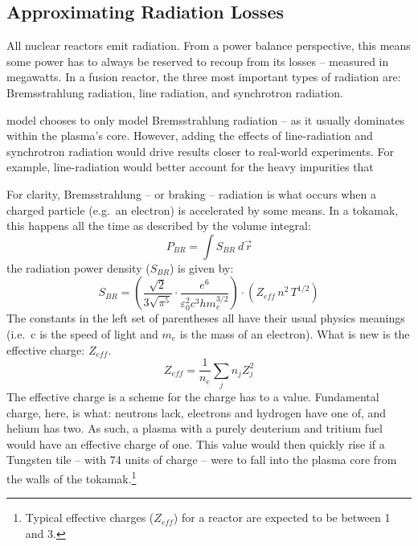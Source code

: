 \subsection{Approximating Radiation Losses}

All nuclear reactors emit radiation. From a power balance perspective, this means some power has to always be reserved to recoup from its losses -- measured in megawatts. In a fusion reactor, the three most important types of radiation are: Bremsstrahlung radiation, line radiation, and synchrotron radiation.

 model chooses to only model Bremsstrahlung radiation -- as it usually dominates within the plasma's core.  However, adding the effects of line-radiation and synchrotron radiation would drive results closer to real-world experiments. For example, line-radiation would better account for the  heavy impurities that 

For clarity, Bremsstrahlung -- or braking -- radiation is what occurs when a charged particle (e.g.\ an electron) is accelerated by some means. In a tokamak, this happens all the time as   described by the volume integral:
\begin{equation}
	P_{BR} = \int S_{BR} \ d \vec{\,r}
\end{equation}
 the radiation power density ($S_{BR}$) is given by:
\begin{equation}
	S_{BR} = \left( \frac{\sqrt{2}}{3 \sqrt{\pi^5}} \cdot \frac{e^6}{\varepsilon_0^2 c^3 h m_e^{3/2}} \right) \cdot \left( Z_{eff} \, n^2 \, T^{1/2} \right)
\end{equation}
The constants in the left set of parentheses all have their usual physics meanings (i.e.\ c is the speed of light and $m_e$ is the mass of an electron). What is new is the effective charge: $Z_{eff}$.\cite{jeff}
\begin{equation}
	Z_{eff} = \frac{1}{n_e} \sum_j n_j Z_j^2
\end{equation}
The effective charge is a scheme for  the charge  has to a  value. Fundamental charge, here, is what: neutrons lack, electrons and hydrogen have one of, and helium has two. As such, a plasma with a purely deuterium and tritium fuel would have an effective charge of one. This value would then quickly rise if a Tungsten tile -- with 74 units of charge -- were to fall into the plasma core from the walls of the tokamak.\footnote{Typical effective charges ($Z_{eff}$) for a reactor are expected to be between 1 and 3.\cite{ussteady,inputfile,arc}}

